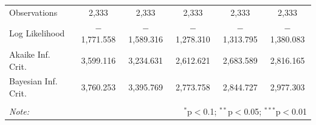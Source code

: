\documentclass[12 pt]{article}
\begin{document}
\begin{table}[htbp]
\begin{tabular}{@{\extracolsep{5pt}}lccccc}
		Observations & 2,333 & 2,333 & 2,333 & 2,333 & 2,333 \\ 
		Log Likelihood & $-$1,771.558 & $-$1,589.316 & $-$1,278.310 & $-$1,313.795 & $-$1,380.083 \\ 
		Akaike Inf. Crit. & 3,599.116 & 3,234.631 & 2,612.621 & 2,683.589 & 2,816.165 \\ 
		Bayesian Inf. Crit. & 3,760.253 & 3,395.769 & 2,773.758 & 2,844.727 & 2,977.303 \\ 
		\hline 
		\hline \\[-1.8ex] 
		\textit{Note:}  & \multicolumn{5}{r}{$^{*}$p$<$0.1; $^{**}$p$<$0.05; $^{***}$p$<$0.01} \\ 
	\end{tabular} 
\end{table} 

\newpage
\end{document}
